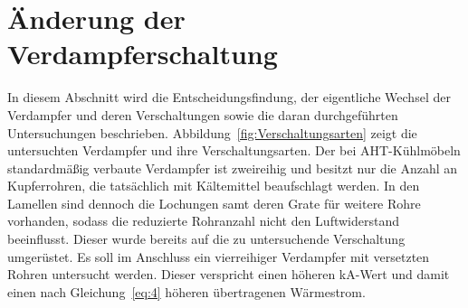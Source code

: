 \section{Änderung der Verdampferschaltung}
\label{sec:Änderung der Verdampferschaltung}

In diesem Abschnitt wird die Entscheidungsfindung, der eigentliche Wechsel der Verdampfer und deren Verschaltungen sowie die daran durchgeführten Untersuchungen beschrieben. Abbildung~\ref{fig:Verschaltungsarten} zeigt die untersuchten Verdampfer und ihre Verschaltungsarten. Der bei AHT-Kühlmöbeln standardmäßig verbaute Verdampfer ist zweireihig und besitzt nur die Anzahl an Kupferrohren, die tatsächlich mit Kältemittel beaufschlagt werden. In den Lamellen sind dennoch die Lochungen samt deren Grate für weitere Rohre vorhanden, sodass die reduzierte Rohranzahl nicht den Luftwiderstand beeinflusst. Dieser wurde bereits auf die zu untersuchende Verschaltung umgerüstet. Es soll im Anschluss ein vierreihiger Verdampfer mit versetzten Rohren untersucht werden. Dieser verspricht einen höheren kA-Wert und damit einen nach Gleichung~\ref{eq:4} höheren übertragenen Wärmestrom. 

